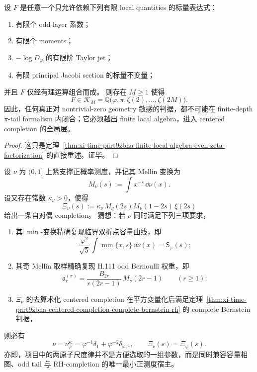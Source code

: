 \begin{corollary}\label{cor:xi-time-part9zbha-no-local-rh-certificate}
设 \(F\) 是任意一个只允许依赖下列有限 local quantities 的标量表达式：
\begin{enumerate}
  \item 有限个 odd-layer 系数；
  \item 有限个 moments；
  \item \(-\log D_\varphi\) 的有限阶 Taylor jet；
  \item 有限 principal Jacobi section 的标量不变量；
\end{enumerate}
并且 \(F\) 仅经有理运算组合而成。
则存在 \(M\ge 1\) 使得
\[
F\in \mathcal K_M
=
\mathbb Q\bigl(\varphi,\pi,\zeta(2),\dots,\zeta(2M)\bigr).
\]
因此，任何真正对 nontrivial-zero geometry 敏感的判据，都不可能在 finite-depth \(\pi\)-tail formalism 内闭合；它必须越出 finite local algebra，进入 centered completion 的全局层。
\end{corollary}
\begin{proof}
这只是定理~\ref{thm:xi-time-part9zbha-finite-local-algebra-even-zeta-factorization} 的直接重述。证毕。
\end{proof}

\begin{conjecture}[最小全局完成化原理]\label{conj:xi-time-part9zbha-minimal-global-completion-principle}
设 \(\nu\) 为 \((0,1]\) 上紧支撑正概率测度，并记其 Mellin 变换为
\[
M_\nu(s):=\int x^{-s}\,\dd\nu(x).
\]
设又存在常数 \(\kappa_\nu>0\)，使得
\[
\Xi_\nu(s):=\kappa_\nu\,M_\nu(2s)M_\nu(1-2s)\,\xi(2s)
\]
给出一条自对偶 completion。
猜想：若 \(\nu\) 同时满足下列三项要求，
\begin{enumerate}
  \item 其 \(\min\)-变换精确复现临界双折点容量曲线，即
  \[
  \frac{\varphi^2}{\sqrt5}\int \min\{x,s\}\,\dd\nu(x)=\mathsf S_\varphi(s);
  \]
  \item 其奇 Mellin 取样精确复现 H.111 odd Bernoulli 权重，即
  \[
  \mathfrak a_r^{(\pi)}
  =
  \frac{B_{2r}}{r(2r-1)}\,M_\nu(2r-1)
  \qquad (r\ge 1);
  \]
  \item \(\Xi_\nu\) 的去算术化 centered completion 在平方变量化后满足定理~\ref{thm:xi-time-part9zbha-centered-completion-complete-bernstein-rh} 的 complete Bernstein 判据，
\end{enumerate}
则必有
\[
\nu=\nu_\varphi^{\mathrm{sc}}
=
\varphi^{-1}\delta_1+\varphi^{-2}\delta_{\varphi^{-1}},
\qquad
\Xi_\nu(s)=\Xi_\varphi(s).
\]
亦即，项目中的两原子尺度律并不是方便选取的一组参数，而是同时兼容容量相图、odd tail 与 RH-completion 的唯一最小正测度宿主。
\end{conjecture}


